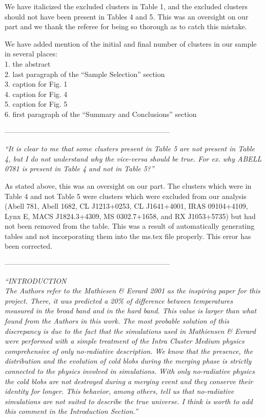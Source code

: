 \documentclass[11pt]{article}
\begin{document}
We have italicized the excluded clusters in Table 1, and the excluded
clusters should not have been present in Tables 4 and 5. This was an
oversight on our part and we thank the referee for being so thorough
as to catch this mistake.

We have added mention of the initial and final number of clusters in
our sample in several places:\\
1. the abstract\\
2. last paragraph of the ``Sample Selection'' section\\
3. caption for Fig. 1\\
4. caption for Fig. 4\\
5. caption for Fig. 5\\
6. first paragraph of the ``Summary and Conclusions'' section

---------------------------------------------------------------------

\textit{
``It is clear to me that some clusters present in Table 5 are not
present in Table 4, but I do not understand why the vice-versa should
be true. For ex. why ABELL 0781 is present in Table 4 and not in Table
5?''
}

As stated above, this was an oversight on our part. The clusters which
were in Table 4 and not Table 5 were clusters which were excluded from
our analysis (Abell 781, Abell 1682, CL J1213+0253, CL J1641+4001,
IRAS 09104+4109, Lynx E, MACS J1824.3+4309, MS 0302.7+1658, and RX
J1053+5735) but had not been removed from the table. This was a result
of automatically generating tables and not incorporating them into the
ms.tex file properly. This error has been corrected.

---------------------------------------------------------------------

\textit{
``{INTRODUCTION}\\
The Authors refer to the Mathiesen \& Evrard 2001 as the inspiring
paper for this project. There, it was predicted a 20\% of difference
between temperatures measured in the broad band and in the hard
band. This value is larger than what found from the Authors in this
work. The most probable solution of this discrepancy is due to the
fact that the simulations used in Mathiensen \& Evrard were performed
with a simple treatment of the Intra Cluster Medium physics
comprehensive of only no-radiative description. We know that the
presence, the distribution and the evolution of cold blobs during the
merging phase is strictly connected to the physics involved in
simulations. With only no-radiative physics the cold blobs are not
destroyed during a merging event and they conserve their identity for
longer. This behavior, among others, tell us that no-radiative
simulations are not suited to describe the true universe. I think is
worth to add this comment in the Introduction Section.''
}
\end{document}
